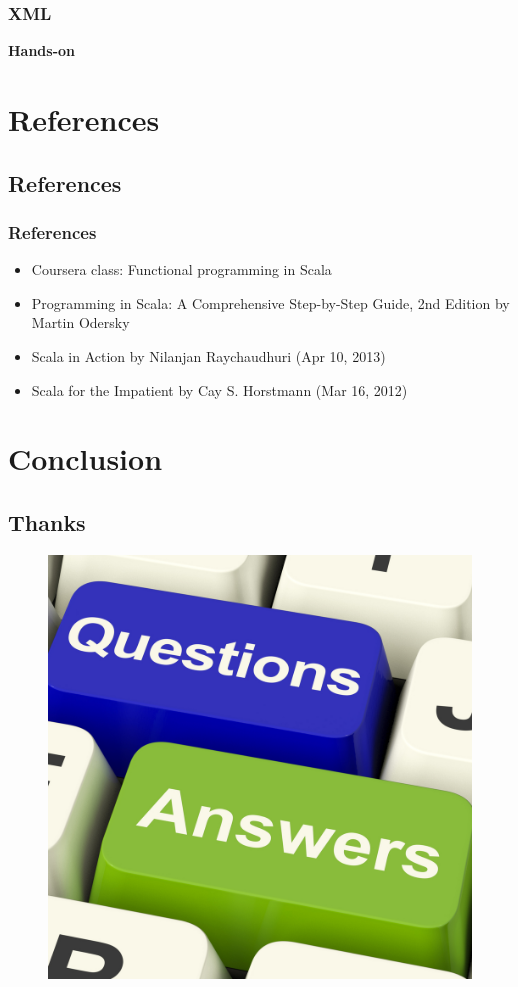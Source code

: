 \documentclass{beamer}
\begin{document}
\begin{frame}
	\frametitle{XML}
	\begin{center}
	{\huge {\bf Hands-on}}
	\end{center}
\end{frame}

\section{References}
\subsection{References}
\begin{frame}
	\frametitle{References}
	\begin{itemize}
		\item Coursera class: Functional programming in Scala
		\item Programming in Scala: A Comprehensive Step-by-Step Guide, 2nd Edition by Martin Odersky
		\item Scala in Action by Nilanjan Raychaudhuri (Apr 10, 2013)
		\item Scala for the Impatient by Cay S. Horstmann (Mar 16, 2012)
	\end{itemize}
\end{frame}


\section{Conclusion}
\subsection{Thanks}
\begin{frame}
	\begin{figure}[htb]
   		\centering
   		\includegraphics[width=1.0\textwidth]{questions.jpg}
	\end{figure}
\end{frame}
\end{document}
